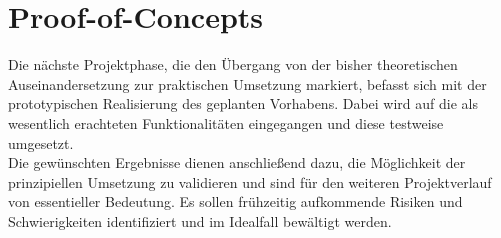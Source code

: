 
\section{Proof-of-Concepts}

Die nächste Projektphase, die den Übergang von der bisher theoretischen Auseinandersetzung zur praktischen Umsetzung markiert, befasst sich mit der prototypischen Realisierung des geplanten Vorhabens. Dabei wird auf die als wesentlich erachteten  Funktionalitäten eingegangen und diese testweise umgesetzt.\\
Die gewünschten Ergebnisse dienen anschließend dazu, die Möglichkeit der prinzipiellen Umsetzung zu validieren und sind für den weiteren Projektverlauf von essentieller Bedeutung. Es sollen frühzeitig aufkommende Risiken und Schwierigkeiten identifiziert  und im Idealfall bewältigt werden.

\vspace{0.5cm}

